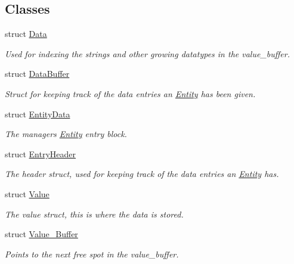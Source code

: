 \subsection*{Classes}
\begin{DoxyCompactItemize}
\item 
struct \hyperlink{struct_m_p_e_1_1_data_manager_1_1_data}{Data}
\begin{DoxyCompactList}\small\item\em Used for indexing the strings and other growing datatypes in the value\+\_\+buffer. \end{DoxyCompactList}\item 
struct \hyperlink{struct_m_p_e_1_1_data_manager_1_1_data_buffer}{Data\+Buffer}
\begin{DoxyCompactList}\small\item\em Struct for keeping track of the data entries an \hyperlink{struct_m_p_e_1_1_entity}{Entity} has been given. \end{DoxyCompactList}\item 
struct \hyperlink{struct_m_p_e_1_1_data_manager_1_1_entity_data}{Entity\+Data}
\begin{DoxyCompactList}\small\item\em The managers \hyperlink{struct_m_p_e_1_1_entity}{Entity} entry block. \end{DoxyCompactList}\item 
struct \hyperlink{struct_m_p_e_1_1_data_manager_1_1_entry_header}{Entry\+Header}
\begin{DoxyCompactList}\small\item\em The header struct, used for keeping track of the data entries an \hyperlink{struct_m_p_e_1_1_entity}{Entity} has. \end{DoxyCompactList}\item 
struct \hyperlink{struct_m_p_e_1_1_data_manager_1_1_value}{Value}
\begin{DoxyCompactList}\small\item\em The value struct, this is where the data is stored. \end{DoxyCompactList}\item 
struct \hyperlink{struct_m_p_e_1_1_data_manager_1_1_value___buffer}{Value\+\_\+\+Buffer}
\begin{DoxyCompactList}\small\item\em Points to the next free spot in the value\+\_\+buffer. \end{DoxyCompactList}\end{DoxyCompactItemize}
